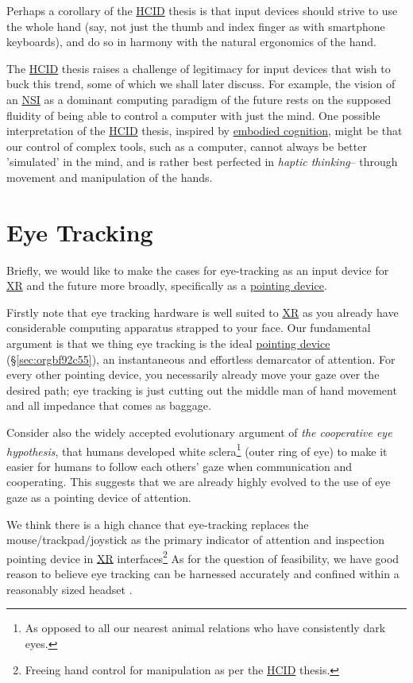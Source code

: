 \documentclass[logo,bsc,singlespacing,parskip]{infthesis}
\begin{document}
Perhaps a corollary of the \hyperref[orgf95a76e]{HCID} thesis is that input devices should strive to use the whole hand (say, not just the thumb and index finger as with smartphone keyboards), and do so in harmony with the natural ergonomics of the hand.

The \hyperref[orgf95a76e]{HCID} thesis raises a challenge of legitimacy for input devices that wish to buck this trend, some of which we shall later discuss.
For example, the vision of an \hyperref[org559faaa]{NSI} as a dominant computing paradigm of the future rests on the supposed fluidity of being able to control a computer with just the mind.
One possible interpretation of the \hyperref[orgf95a76e]{HCID} thesis, inspired by \hyperref[orgb456c86]{embodied cognition}, might be that our control of complex tools, such as a computer, cannot always be better 'simulated' in the mind, and is rather best perfected in \emph{haptic thinking}-- through movement and manipulation of the hands.

\section{Eye Tracking}
\label{sec:org33c92da}
Briefly, we would like to make the cases for eye-tracking as an input device for \hyperref[org88b0f70]{XR} and the future more broadly, specifically as a \hyperref[pointing device]{pointing device}.

Firstly note that eye tracking hardware is well suited to \hyperref[org88b0f70]{XR} as you already have considerable computing apparatus strapped to your face.
Our fundamental argument is that we thing eye tracking is the ideal \hyperref[sec:orgbf92c55]{pointing device} (\S \ref{sec:orgbf92c55}), an instantaneous and effortless demarcator of attention.
For every other pointing device, you necessarily already move your gaze over the desired path; eye tracking is just cutting out the middle man of hand movement and all impedance that comes as baggage.

Consider also the widely accepted evolutionary argument of \emph{the cooperative eye hypothesis}, that humans developed white sclera\footnote{As opposed to all our nearest animal relations who have consistently dark eyes.} (outer ring of eye) to make it easier for humans to follow each others' gaze when communication and cooperating.
This suggests that we are already highly evolved to the use of eye gaze as a pointing device of attention.

We think there is a high chance that eye-tracking replaces the mouse/trackpad/joystick as the primary indicator of attention and inspection pointing device in \hyperref[org88b0f70]{XR} interfaces\footnote{Freeing hand control for manipulation as per the \hyperref[orgf95a76e]{HCID} thesis.}
As for the question of feasibility, we have good reason to believe eye tracking can be harnessed accurately \autocites{PrecisionGazeMouse}[][]{TobiiGamingNext} and confined within a reasonably sized headset \autocite{VIVEProEye}.
\end{document}

